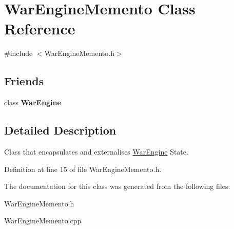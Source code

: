 \hypertarget{classWarEngineMemento}{}\section{War\+Engine\+Memento Class Reference}
\label{classWarEngineMemento}


{\ttfamily \#include $<$War\+Engine\+Memento.\+h$>$}

\subsection*{Friends}
\begin{DoxyCompactItemize}
\item 
\mbox{\label{classWarEngineMemento_abc1564d646c3fdc348c5320f301d01ff}} 
class {\bfseries War\+Engine}
\end{DoxyCompactItemize}


\subsection{Detailed Description}
Class that encapsulates and externalises \hyperlink{classWarEngine}{War\+Engine} State. 

Definition at line 15 of file War\+Engine\+Memento.\+h.



The documentation for this class was generated from the following files\+:\begin{DoxyCompactItemize}
\item 
War\+Engine\+Memento.\+h\item 
War\+Engine\+Memento.\+cpp\end{DoxyCompactItemize}
